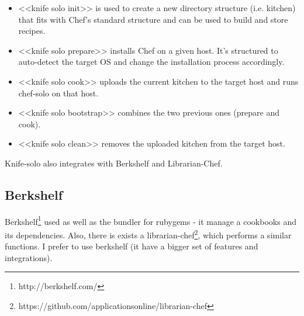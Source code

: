 \begin{itemize}
  \item <<knife solo init>> is used to create a new directory structure (i.e. kitchen) that fits with Chef's standard structure and can be used to build and store recipes.
  \item <<knife solo prepare>> installs Chef on a given host. It's structured to auto-detect the target OS and change the installation process accordingly.
  \item <<knife solo cook>> uploads the current kitchen to the target host and runs chef-solo on that host.
  \item <<knife solo bootstrap>> combines the two previous ones (prepare and cook).
  \item <<knife solo clean>> removes the uploaded kitchen from the target host.
\end{itemize}

Knife-solo also integrates with Berkshelf and Librarian-Chef.

\subsection{Berkshelf}

Berkshelf\footnote{http://berkshelf.com/} used as well as the bundler for rubygems - it manage a cookbooks and its dependencies. Also, there is exists a librarian-chef\footnote{https://github.com/applicationsonline/librarian-chef}, which performs a similar functions. I prefer to use berkshelf (it have a bigger set of features and integrations).

